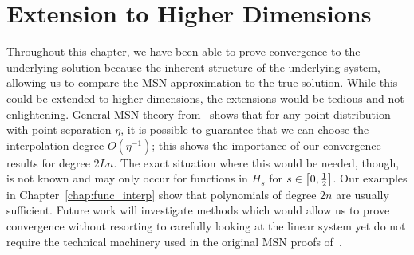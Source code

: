 \section{Extension to Higher Dimensions}
\label{sec:cvip_extension}

Throughout this chapter, we have been able to prove convergence to
the underlying solution because the inherent structure of the underlying
system, allowing us to compare the MSN approximation to the true solution.
While this could be extended to higher dimensions, the extensions would
be tedious and not enlightening.
General MSN theory from~\cite{msnInterp,msnBirkhoff} shows that
for any point distribution with point separation $\eta$, it is possible
to guarantee that we can choose the interpolation degree $O(\eta^{-1})$;
this shows the importance of our convergence results for degree $2Ln$.
The exact situation where this would be needed, though, is not known
and may only occur for functions in $H_{s}$
for $s\in\left[ 0,\frac{1}{2} \right]$.
Our examples in Chapter~\ref{chap:func_interp} show that polynomials
of degree $2n$ are usually sufficient.
Future work will investigate methods which would allow us to prove
convergence without resorting to carefully looking at the linear system
yet do not require the technical machinery used in the original
MSN proofs of~\cite{msnInterp,msnBirkhoff}.
